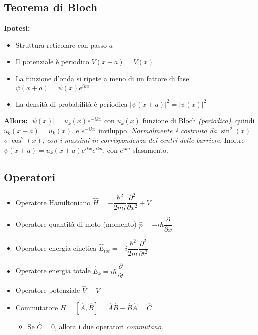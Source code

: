 \documentclass[9pt]{extarticle}
\begin{document}
\subsection{Teorema di Bloch}
\textbf{Ipotesi:}
\begin{itemize}
  \item Struttura reticolare con passo \( a \)
  \item Il potenziale è periodico \( V(x+a) = V(x) \)
  \item La funzione d'onda si ripete a meno di un fattore di fase \( \psi(x+a) = \psi(x) e^{ i k  a} \)
  \item La densità di probabilità è periodica \( \left| \psi(x+a) \right|^2 = \left| \psi(x)  \right|^2 \)
\end{itemize}
\textbf{Allora:} \( \left| \psi(x) \right| = u_k(x) e^{ -ikx } \) con \( u_k(x) \) funzione di Bloch \textit{(periodica)}, quindi \( u_k (x+a) = u_k(x).\) e \( e^{ -ikx } \) inviluppo.
\newline
\textit{Normalmente è costruita da \(\sin^2(x)\) o \(\cos^2(x)\), con i massimi in corrispondenza dei centri delle barriere}. \newline
\smallskip
Inoltre \( \psi(x+a) = u_k (x+a) e^{ikx} e^{ika} \), con \( e^{ika} \) sfasamento.

\subsection{Operatori}
\begin{itemize}
  \item Operatore Hamiltoniano \( \hat{H} = - \dfrac{\hbar ^ 2}{2mi} \dfrac{\partial ^ 2}{\partial x ^ 2} + V \)
  \item Operatore quantità di moto (momento) \( \hat{p} = -i \hbar \dfrac{\partial}{\partial x} \)
  \item Operatore energia cinetica \( \hat{E}_{tot} = -i \dfrac{\hbar ^ 2}{2m} \dfrac{\partial ^ 2}{\partial t ^ 2} \)
  \item Operatore energia totale \( \hat{E}_k = i \hbar \dfrac{\partial }{\partial t} \)
  \item Operatore potenziale \( \hat{V} = V \)
  \item Commutatore \( H = [\hat{A}, \hat{B}] = \hat{A}\hat{B} - \hat{B}\hat{A} = \hat{C} \)
        \begin{itemize}
          \item Se \( \hat{C} = 0 \), allora i due operatori \textit{commutano}.
        \end{itemize}
\end{itemize}
\end{document}
